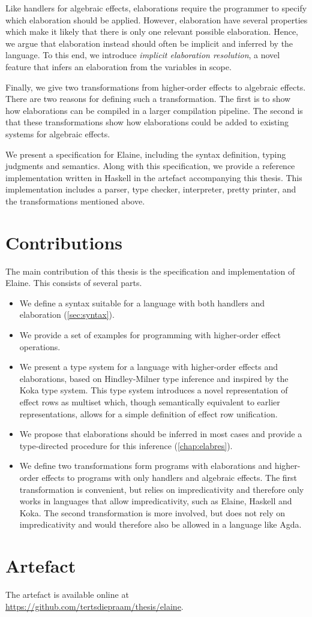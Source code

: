 Like handlers for algebraic effects, elaborations require the programmer to specify which elaboration should be applied. However, elaboration have several properties which make it likely that there is only one relevant possible elaboration. Hence, we argue that elaboration instead should often be implicit and inferred by the language. To this end, we introduce \emph{implicit elaboration resolution}, a novel feature that infers an elaboration from the variables in scope.

Finally, we give two transformations from higher-order effects to algebraic effects. There are two reasons for defining such a transformation. The first is to show how elaborations can be compiled in a larger compilation pipeline. The second is that these transformations show how elaborations could be added to existing systems for algebraic effects.

We present a specification for Elaine, including the syntax definition, typing judgments and semantics. Along with this specification, we provide a reference implementation written in Haskell in the artefact accompanying this thesis. This implementation includes a parser, type checker, interpreter, pretty printer, and the transformations mentioned above.

\section{Contributions}

The main contribution of this thesis is the specification and implementation of Elaine. This consists of several parts.

\begin{itemize}
    \item We define a syntax suitable for a language with both handlers and elaboration (\cref{sec:syntax}).
    \item We provide a set of examples for programming with higher-order effect operations.
    \item We present a type system for a language with higher-order effects and elaborations, based on Hindley-Milner type inference and inspired by the Koka type system. This type system introduces a novel representation of effect rows as multiset which, though semantically equivalent to earlier representations, allows for a simple definition of effect row unification.
    \item We propose that elaborations should be inferred in most cases and provide a type-directed procedure for this inference (\cref{chap:elabres}).
    \item We define two transformations form programs with elaborations and higher-order effects to programs with only handlers and algebraic effects. The first transformation is convenient, but relies on impredicativity and therefore only works in languages that allow impredicativity, such as Elaine, Haskell and Koka. The second transformation is more involved, but does not rely on impredicativity and would therefore also be allowed in a language like Agda.
\end{itemize}

\section{Artefact}


The artefact is available online at \url{https://github.com/tertsdiepraam/thesis/elaine}.